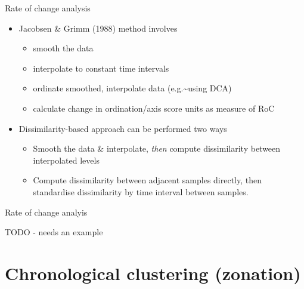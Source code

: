 \documentclass[10pt,ignorenonframetext,compress, aspectratio=169]{beamer}
\providecommand{\tightlist}{%
  \setlength{\itemsep}{0pt}\setlength{\parskip}{0pt}}
\begin{document}
\begin{frame}{Rate of change analysis}

\begin{itemize}
\tightlist
\item
  Jacobsen \& Grimm (1988) method involves

  \begin{itemize}
  \tightlist
  \item
    smooth the data
  \item
    interpolate to constant time intervals
  \item
    ordinate smoothed, interpolate data (e.g.\textasciitilde{}using DCA)
  \item
    calculate change in ordination/axis score units as measure of RoC
  \end{itemize}
\item
  Dissimilarity-based approach can be performed two ways

  \begin{itemize}
  \tightlist
  \item
    Smooth the data \& interpolate, \emph{then} compute dissimilarity
    between interpolated levels
  \item
    Compute dissimilarity between adjacent samples directly, then
    standardise dissimilarity by time interval between samples.
  \end{itemize}
\end{itemize}

\end{frame}

\begin{frame}{Rate of change analyis}

TODO - needs an example

\end{frame}

\section{Chronological clustering
(zonation)}\label{chronological-clustering-zonation}
\end{document}
